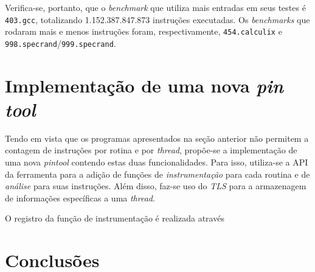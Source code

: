 \documentclass[12pt]{article}
\begin{document}
Verifica-se, portanto, que o \textit{benchmark} que utiliza mais entradas em
seus testes é \texttt{403.gcc}, totalizando 1.152.387.847.873 instruções
executadas. Os \textit{benchmarks} que rodaram mais e menos instruções foram,
respectivamente, \texttt{454.calculix} e
\texttt{998.specrand}/\texttt{999.specrand}.


\section{Implementação de uma nova \textit{pin tool}} \label{sec:tool}

Tendo em vista que os programas apresentados na seção anterior não permitem a
contagem de instruções por rotina e por \textit{thread}, propõe-se a
implementação de uma nova \textit{pintool} contendo estas duas funcionalidades.
Para isso, utiliza-se a API da ferramenta para a adição de funções de
\textit{instrumentação} para cada routina e de \textit{análise} para suas
instruções. Além disso, faz-se uso do \textit{TLS} para a armazenagem de
informações específicas a uma \textit{thread}.

O registro da função de instrumentação é realizada através

\section{Conclusões}




\end{document}

